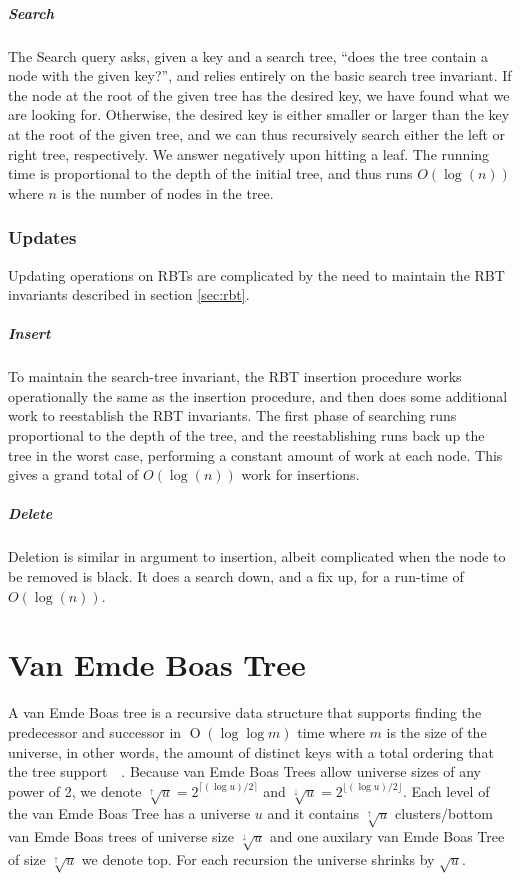 \documentclass[oneside,11pt,openright]{report}
\newcommand{\BigO}[1]{\ensuremath{\operatorname{O}\left(#1\right)}}
\newcommand{\HIGHER}{\sqrt[\uparrow]{u}}
\newcommand{\LOWER}{\sqrt[\downarrow]{u}}
\begin{document}
\paragraph{Search} The Search query asks, given a key and a search
tree, ``does the tree contain a node with the given key?'', and relies
entirely on the basic search tree invariant. If the node at the root
of the given tree has the desired key, we have found what we are
looking for. Otherwise, the desired key is either smaller or larger
than the key at the root of the given tree, and we can thus
recursively search either the left or right tree, respectively. We
answer negatively upon hitting a leaf. The running time is
proportional to the depth of the initial tree, and thus runs
$O(\log(n))$ where $n$ is the number of nodes in the tree.

\subsection{Updates}

Updating operations on RBTs are complicated by the need to maintain
the RBT invariants described in section \ref{sec:rbt}.

\paragraph{Insert} To maintain the search-tree invariant, the
RBT insertion procedure works operationally the same as the insertion
procedure, and then does some additional work to reestablish the RBT
invariants. The first phase of searching runs proportional to the
depth of the tree, and the reestablishing runs back up the tree in the
worst case, performing a constant amount of work at each node. This
gives a grand total of $O(\log(n))$ work for insertions.

\paragraph{Delete} Deletion is similar in argument to insertion,
albeit complicated when the node to be removed is black. It does a
search down, and a fix up, for a run-time of $O(\log(n))$.


\chapter{Van Emde Boas Tree}

A van Emde Boas tree is a recursive data structure that supports
finding the predecessor and successor in \BigO{\log \log m} time where
$m$ is the size of the universe, in other words, the amount of
distinct keys with a total ordering that the tree
support~\cite[p. 545]{ITA09}~\cite{VEB04}. Because van Emde Boas Trees
allow universe sizes of any power of 2, we denote $\HIGHER =
2^{\lceil{(\log u)/2}\rceil}$ and $\LOWER = 2^{\lfloor{(\log
    u)/2}\rfloor}$.  Each level of the van Emde Boas Tree has a
universe $u$ and it contains $\HIGHER$ clusters/bottom van Emde Boas
trees of universe size $\LOWER$ and one auxilary van Emde Boas Tree of
size $\HIGHER$ we denote top.  For each recursion the universe shrinks
by $\sqrt{u}$.
\end{document}
